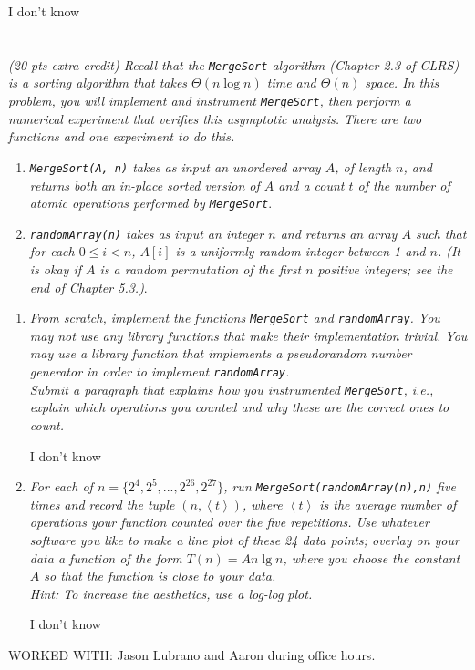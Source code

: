 \documentclass[12pt]{article} \setlength{\oddsidemargin}{0in}
\begin{document}
\begin{enumerate}
I don't know 

\end{enumerate}
\section{}
\textit{(20 pts extra credit) Recall that the \texttt{MergeSort} algorithm (Chapter 2.3 of CLRS) is a sorting algorithm that takes $\Theta(n \log n)$ time and $\Theta(n)$ space. In this problem, you will implement and instrument \texttt{MergeSort}, then perform a numerical experiment that verifies this asymptotic analysis. There are two functions and one experiment to do this.}
\begin{enumerate}[label=(\roman*)]
\item\textit{\texttt{MergeSort(A, n)} takes as input an unordered array $A$, of length $n$, and returns both an in-place sorted version of $A$ and a count $t$ of the number of atomic operations performed by \texttt{MergeSort}}.
\item\textit{\texttt{randomArray(n)} takes as input an integer $n$ and returns an array $A$ such that for each $0 \leq i < n$, $A[i]$ is a uniformly random integer between 1 and $n$. (It is okay if $A$ is a random permutation of the first $n$ positive integers; see the end of Chapter 5.3.)}.
\end{enumerate}
\begin{enumerate}
\item\textit{From scratch, implement the functions \texttt{MergeSort} and \texttt{randomArray}. You may not use any library functions that make their implementation trivial. You may use a library function that implements a pseudorandom number generator in order to implement \texttt{randomArray}.\\
Submit a paragraph that explains how you instrumented \texttt{MergeSort}, i.e., explain which operations you counted and why these are the correct ones to count.}

I don't know 

\item\textit{For each of $n = \{2^4,2^5,...,2^{26},2^{27}\}$, run \texttt{MergeSort(randomArray(n),n)} five times and record the tuple $(n, \left<t\right>)$, where $\left<t\right>$ is the average number of operations your function counted over the five repetitions. Use whatever software you like to make a line plot of these 24 data points; overlay on your data a function of the form $T(n) = An\lg n$, where you choose the constant $A$ so that the function is close to your data.\\
Hint: To increase the aesthetics, use a log-log plot.}

I don't know 

\end{enumerate}

WORKED WITH: Jason Lubrano and Aaron  during office hours. 
\end{document}
